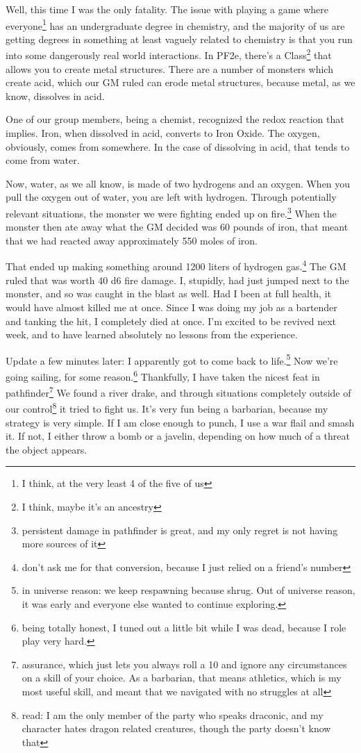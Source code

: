 \documentclass[12pt]{article}[titlepage]
\renewcommand{\,}{\textsuperscript{,}}
\begin{document}
Well, this time I was the only fatality.
The issue with playing a game where everyone\footnote{I think, at the very least 4 of the five of us} has an undergraduate degree in chemistry, and the majority of us are getting degrees in something at least vaguely related to chemistry is that you run into some dangerously real world interactions.
In PF2e, there's a Class\footnote{I think, maybe it's an ancestry} that allows you to create metal structures.
There are a number of monsters which create acid, which our GM ruled can erode metal structures, because metal, as we know, dissolves in acid.

One of our group members, being a chemist, recognized the redox reaction that implies.
Iron, when dissolved in acid, converts to Iron Oxide.
The oxygen, obviously, comes from somewhere.
In the case of dissolving in acid, that tends to come from water.

Now, water, as we all know, is made of two hydrogens and an oxygen.
When you pull the oxygen out of water, you are left with hydrogen.
Through potentially relevant situations, the monster we were fighting ended up on fire.\footnote{persistent damage in pathfinder is great, and my only regret is not having more sources of it}
When the monster then ate away what the GM decided was 60 pounds of iron, that meant that we had reacted away approximately 550 moles of iron.

That ended up making something around 1200 liters of hydrogen gas.\footnote{don't ask me for that conversion, because I just relied on a friend's number}
The GM ruled that was worth 40 d6 fire damage.
I, stupidly, had just jumped next to the monster, and so was caught in the blast as well.
Had I been at full health, it would have almost killed me at once.
Since I was doing my job as a bartender and tanking the hit, I completely died at once.
I'm excited to be revived next week, and to have learned absolutely no lessons from the experience.

Update a few minutes later: I apparently got to come back to life.\footnote{in universe reason: we keep respawning because shrug.
Out of universe reason, it was early and everyone else wanted to continue exploring.}
Now we're going sailing, for some reason.\footnote{being totally honest, I tuned out a little bit while I was dead, because I role play very hard.}
Thankfully, I have taken the nicest feat in pathfinder\footnote{assurance, which just lets you always roll a 10 and ignore any circumstances on a skill of your choice.
As a barbarian, that means athletics, which is my most useful skill, and meant that we navigated with no struggles at all}
We found a river drake, and through situations completely outside of our control\footnote{read: I am the only member of the party who speaks draconic, and my character hates dragon related creatures, though the party doesn't know that} it tried to fight us.
It's very fun being a barbarian, because my strategy is very simple.
If I am close enough to punch, I use a war flail and smash it.
If not, I either throw a bomb or a javelin, depending on how much of a threat the object appears.
\end{document}
